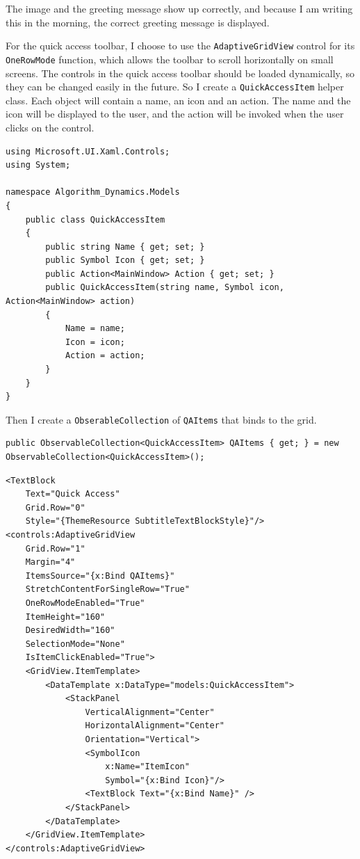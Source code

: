 \documentclass[a4paper]{report}
\begin{document}
The image and the greeting message show up correctly, and because I am writing this in the morning, the correct greeting message is displayed.

For the quick access toolbar, I choose to use the \verb|AdaptiveGridView| control for its \verb|OneRowMode| function, which allows the toolbar to scroll horizontally on small screens. The controls in the quick access toolbar should be loaded dynamically, so they can be changed easily in the future. So I create a \verb|QuickAccessItem| helper class. Each object will contain a name, an icon and an action. The name and the icon will be displayed to the user, and the action will be invoked when the user clicks on the control.

\begin{verbatim}
using Microsoft.UI.Xaml.Controls;
using System;

namespace Algorithm_Dynamics.Models
{
    public class QuickAccessItem
    {
        public string Name { get; set; }
        public Symbol Icon { get; set; }
        public Action<MainWindow> Action { get; set; }
        public QuickAccessItem(string name, Symbol icon, Action<MainWindow> action)
        {
            Name = name;
            Icon = icon;
            Action = action;
        }
    }
}
\end{verbatim}

Then I create a \verb|ObserableCollection| of \verb|QAItems| that binds to the grid.

\begin{verbatim}
public ObservableCollection<QuickAccessItem> QAItems { get; } = new ObservableCollection<QuickAccessItem>();
\end{verbatim}

\begin{verbatim}
<TextBlock 
    Text="Quick Access"
    Grid.Row="0"
    Style="{ThemeResource SubtitleTextBlockStyle}"/>
<controls:AdaptiveGridView 
    Grid.Row="1"
    Margin="4"
    ItemsSource="{x:Bind QAItems}"
    StretchContentForSingleRow="True"
    OneRowModeEnabled="True"
    ItemHeight="160"
    DesiredWidth="160"
    SelectionMode="None"
    IsItemClickEnabled="True">
    <GridView.ItemTemplate>
        <DataTemplate x:DataType="models:QuickAccessItem">
            <StackPanel 
                VerticalAlignment="Center"
                HorizontalAlignment="Center"
                Orientation="Vertical">
                <SymbolIcon 
                    x:Name="ItemIcon"
                    Symbol="{x:Bind Icon}"/>
                <TextBlock Text="{x:Bind Name}" />
            </StackPanel>
        </DataTemplate>
    </GridView.ItemTemplate>
</controls:AdaptiveGridView>
\end{verbatim}
\end{document}
